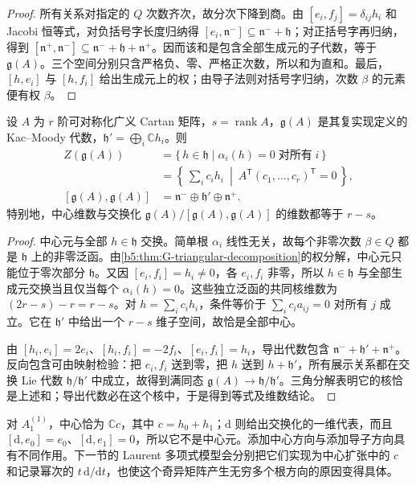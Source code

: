 \begin{proof}
	所有关系对指定的 \(Q\) 次数齐次，故分次下降到商。由 \([e_i,f_j]=\delta_{ij}h_i\) 和 Jacobi 恒等式，对负括号字长度归纳得 \([e_i,\mathfrak n^-]\subseteq\mathfrak n^-+\mathfrak h\)；对正括号字再归纳，得到 \([\mathfrak n^+,\mathfrak n^-]\subseteq\mathfrak n^-+\mathfrak h+\mathfrak n^+\)。因而该和是包含全部生成元的子代数，等于 \(\mathfrak g(A)\)。三个空间分别只含严格负、零、严格正次数，所以和为直和。最后，\([h,e_i]\) 与 \([h,f_i]\) 给出生成元上的权；由导子法则对括号字归纳，次数 \(\beta\) 的元素便有权 \(\beta\)。
\end{proof}

\begin{proposition}\label{b5:prop:G-central-directions}
	设 \(A\) 为 \(r\) 阶可对称化广义 Cartan 矩阵，\(s=\operatorname{rank}A\)，\(\mathfrak g(A)\) 是其复实现定义的 Kac--Moody 代数，\(\mathfrak h'=\bigoplus_i\mathbb Ch_i\)。则
	\[
		\begin{aligned}
			Z(\mathfrak g(A))
			&=\{\,h\in\mathfrak h\mid \alpha_i(h)=0\;\text{对所有}\;i\,\}\\
			&=\left\{\,\sum_i c_ih_i\ \middle|\ A^{\mathsf T}(c_1,\ldots,c_r)^{\mathsf T}=0\,\right\},\\
			[\mathfrak g(A),\mathfrak g(A)]
			&=\mathfrak n^-\oplus\mathfrak h'\oplus\mathfrak n^+.
		\end{aligned}
	\]
	特别地，中心维数与交换化 \(\mathfrak g(A)/[\mathfrak g(A),\mathfrak g(A)]\) 的维数都等于 \(r-s\)。
\end{proposition}
\begin{proof}
	中心元与全部 \(h\in\mathfrak h\) 交换。简单根 \(\alpha_i\) 线性无关，故每个非零次数 \(\beta\in Q\) 都是 \(\mathfrak h\) 上的非零泛函。由\cref{b5:thm:G-triangular-decomposition}的权分解，中心元只能位于零次部分 \(\mathfrak h\)。又因 \([e_i,f_i]=h_i\ne0\)，各 \(e_i,f_i\) 非零，所以 \(h\in\mathfrak h\) 与全部生成元交换当且仅当每个 \(\alpha_i(h)=0\)。这些独立泛函的共同核维数为 \((2r-s)-r=r-s\)。对 \(h=\sum_i c_ih_i\)，条件等价于 \(\sum_i c_i a_{ij}=0\) 对所有 \(j\) 成立。它在 \(\mathfrak h'\) 中给出一个 \(r-s\) 维子空间，故恰是全部中心。

	由 \([h_i,e_i]=2e_i\)、\([h_i,f_i]=-2f_i\)、\([e_i,f_i]=h_i\)，导出代数包含 \(\mathfrak n^-+\mathfrak h'+\mathfrak n^+\)。反向包含可由映射检验：把 \(e_i,f_i\) 送到零，把 \(h\) 送到 \(h+\mathfrak h'\)，所有展示关系都在交换 Lie 代数 \(\mathfrak h/\mathfrak h'\) 中成立，故得到满同态 \(\mathfrak g(A)\to\mathfrak h/\mathfrak h'\)。三角分解表明它的核恰是上述和；导出代数必在这个核中，于是得到等式及维数结论。
\end{proof}

对 \(A_1^{(1)}\)，中心恰为 \(\mathbb Cc\)，其中 \(c=h_0+h_1\)；\(\mathrm d\) 则给出交换化的一维代表，而且 \([\mathrm d,e_0]=e_0\)、\([\mathrm d,e_1]=0\)，所以它不是中心元。添加中心方向与添加导子方向具有不同作用。下一节的 Laurent 多项式模型会分别把它们实现为中心扩张中的 \(c\) 和记录幂次的 \(t\,\mathrm d/\mathrm dt\)，也使这个奇异矩阵产生无穷多个根方向的原因变得具体。
